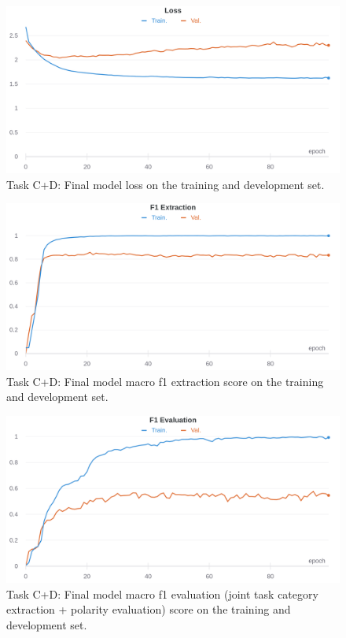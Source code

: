 \documentclass[11pt,a4paper]{article}
\begin{document}
	\begin{figure}[H]
		\centering
		\includegraphics[width=1\columnwidth]{M3_cd_loss.png}
		\caption{Task C+D: Final model loss on the training and development set.}
		\label{fig:cd_loss}
	\end{figure}

	\begin{figure}[H]
		\centering
		\includegraphics[width=1\columnwidth]{M3_cd_f1_extr.png}
		\caption{Task C+D: Final model macro f1 extraction score on the training and development set.}
		\label{fig:cd_f1_extr}
	\end{figure}

	\begin{figure}[H]
		\centering
		\includegraphics[width=1\columnwidth]{M3_cd_f1_eval.png}
		\caption{Task C+D: Final model macro f1 evaluation (joint task category extraction + polarity evaluation) score on the training and development set.}
		\label{fig:cd_f1_eval}
	\end{figure}
	
	
	
	
	
	
	
\end{document}

